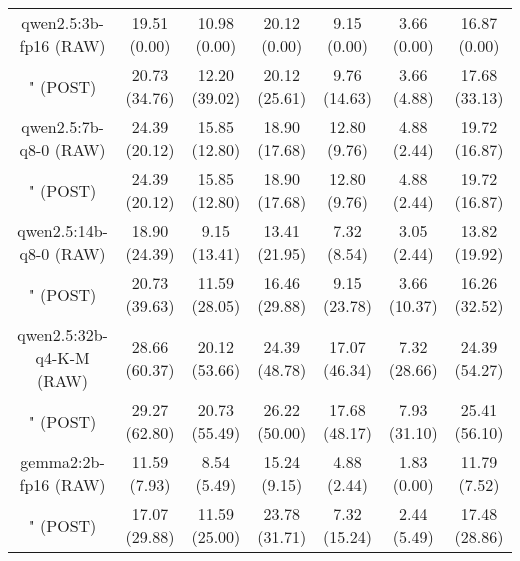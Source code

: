 \begin{table}[]
{\begin{tabular}{ccccccc}
      \multicolumn{1}{c|}{qwen2.5:3b-fp16 (RAW)} & 19.51 (0.00) & 10.98 (0.00) & \multicolumn{1}{c|}{20.12 (0.00)} & 9.15 (0.00) & \multicolumn{1}{c|}{3.66 (0.00)} & 16.87 (0.00) \\

      \multicolumn{1}{c|}{" (POST)} & 20.73 (34.76) & 12.20 (39.02) & \multicolumn{1}{c|}{20.12 (25.61)} & 9.76 (14.63) & \multicolumn{1}{c|}{3.66 (4.88)} & 17.68 (33.13) \\
      \cline{1-7}

      \multicolumn{1}{c|}{qwen2.5:7b-q8-0 (RAW)} & 24.39 (20.12) & 15.85 (12.80) & \multicolumn{1}{c|}{18.90 (17.68)} & 12.80 (9.76) & \multicolumn{1}{c|}{4.88 (2.44)} & 19.72 (16.87) \\

      \multicolumn{1}{c|}{" (POST)} & 24.39 (20.12) & 15.85 (12.80) & \multicolumn{1}{c|}{18.90 (17.68)} & 12.80 (9.76) & \multicolumn{1}{c|}{4.88 (2.44)} & 19.72 (16.87) \\
      \cline{1-7}

      \multicolumn{1}{c|}{qwen2.5:14b-q8-0 (RAW)} & 18.90 (24.39) & 9.15 (13.41) & \multicolumn{1}{c|}{13.41 (21.95)} & 7.32 (8.54) & \multicolumn{1}{c|}{3.05 (2.44)} & 13.82 (19.92) \\

      \multicolumn{1}{c|}{" (POST)} & 20.73 (39.63) & 11.59 (28.05) & \multicolumn{1}{c|}{16.46 (29.88)} & 9.15 (23.78) & \multicolumn{1}{c|}{3.66 (10.37)} & 16.26 (32.52) \\
      \cline{1-7}

      \multicolumn{1}{c|}{qwen2.5:32b-q4-K-M (RAW)} & 28.66 (60.37) & 20.12 (53.66) & \multicolumn{1}{c|}{24.39 (48.78)} & 17.07 (46.34) & \multicolumn{1}{c|}{7.32 (28.66)} & 24.39 (54.27) \\

      \multicolumn{1}{c|}{" (POST)} & 29.27 (62.80) & 20.73 (55.49) & \multicolumn{1}{c|}{26.22 (50.00)} & 17.68 (48.17) & \multicolumn{1}{c|}{7.93 (31.10)} & 25.41 (56.10) \\
      \cline{1-7}

      \multicolumn{1}{c|}{gemma2:2b-fp16 (RAW)} & 11.59 (7.93) & 8.54 (5.49) & \multicolumn{1}{c|}{15.24 (9.15)} & 4.88 (2.44) & \multicolumn{1}{c|}{1.83 (0.00)} & 11.79 (7.52) \\

      \multicolumn{1}{c|}{" (POST)} & 17.07 (29.88) & 11.59 (25.00) & \multicolumn{1}{c|}{23.78 (31.71)} & 7.32 (15.24) & \multicolumn{1}{c|}{2.44 (5.49)} & 17.48 (28.86) \\
      \cline{1-7}


\end{tabular}}
\end{table}
